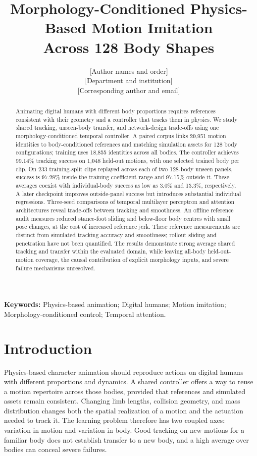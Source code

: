 \documentclass[11pt]{article}
\title{Morphology-Conditioned Physics-Based Motion Imitation\\
Across 128 Body Shapes}
\author{[Author names and order]\\
\small [Department and institution]\\
\small [Corresponding author and email]}
\date{}
\begin{document}
\maketitle
\begin{abstract}
Animating digital humans with different body proportions requires references
consistent with their geometry and a controller that tracks them in physics.
We study shared tracking, unseen-body transfer, and network-design trade-offs
using one morphology-conditioned temporal controller. A paired corpus links
20,951 motion identities to body-conditioned references and matching
simulation assets for 128 body configurations; training uses 18,855 identities
across all bodies. The controller achieves 99.14\% tracking success on 1,048
held-out motions, with one selected trained body per clip. On 233
training-split clips replayed across each of two 128-body unseen panels,
success is 97.28\% inside the training coefficient range and 97.15\% outside
it. These averages coexist with individual-body success as low as 3.0\%
and 13.3\%, respectively. A later checkpoint improves outside-panel success
but introduces substantial individual regressions. Three-seed comparisons of
temporal multilayer perceptron and attention architectures reveal trade-offs
between tracking and smoothness. An offline reference audit measures reduced
stance-foot sliding and below-floor body centres with small pose changes,
at the cost of increased reference jerk. These reference measurements are
distinct from simulated tracking accuracy and smoothness; rollout sliding
and penetration have not been quantified. The results demonstrate strong
average shared tracking and transfer within the evaluated domain, while
leaving all-body held-out-motion coverage, the causal contribution of explicit
morphology inputs, and severe failure mechanisms unresolved.
\end{abstract}

\noindent\textbf{Keywords:} Physics-based animation; Digital humans;
Motion imitation; Morphology-conditioned control; Temporal attention.



\section{Introduction}\label{sec:introduction}
Physics-based character animation should reproduce actions on digital humans
with different proportions and dynamics. A shared controller offers a way to
reuse a motion repertoire across those bodies, provided that references and
simulated assets remain consistent. Changing limb lengths, collision
geometry, and mass distribution changes both the spatial realization of a
motion and the actuation needed to track it. The learning problem therefore
has two coupled axes: variation in motion and variation in body. Good
tracking on new motions for a familiar body does not establish transfer to
a new body, and a high average over bodies can conceal severe failures.
\end{document}
